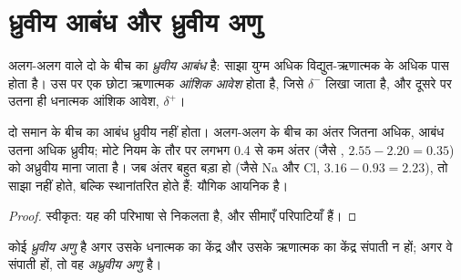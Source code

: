 \section{ध्रुवीय आबंध और ध्रुवीय अणु}

\begin{definition}[ध्रुवीय आबंध, आंशिक आवेश]\label{def:g11:polarity-and-cohesion:polar-bond}
अलग-अलग  वाले दो  के बीच का 
\emph{ध्रुवीय आबंध} है: साझा युग्म अधिक विद्युत-ऋणात्मक
 के अधिक पास होता है। उस  पर एक छोटा ऋणात्मक
\emph{आंशिक आवेश} होता है, जिसे $\delta^-$ लिखा जाता है, और
दूसरे  पर उतना ही धनात्मक आंशिक आवेश, $\delta^+$।
\end{definition}

\begin{proposition}[आबंध कब ध्रुवीय होता है?]\label{prop:g11:polarity-and-cohesion:polar-bond}
दो समान  के बीच का आबंध ध्रुवीय नहीं होता। अलग-अलग  के बीच
 का अंतर जितना अधिक, आबंध उतना अधिक ध्रुवीय; मोटे नियम के
तौर पर लगभग 0.4 से कम अंतर (जैसे
, $2.55 - 2.20 = 0.35$) को अध्रुवीय माना जाता है। जब अंतर बहुत
बड़ा हो (जैसे Na और Cl, $3.16 - 0.93 = 2.23$), तो  साझा नहीं होते,
बल्कि स्थानांतरित होते हैं: यौगिक आयनिक है।
\end{proposition}

\begin{proof}
स्वीकृत: यह  की परिभाषा से निकलता है, और सीमाएँ
परिपाटियाँ हैं।
\end{proof}

\begin{definition}[ध्रुवीय और अध्रुवीय अणु]\label{def:g11:polarity-and-cohesion:polar-molecule}
कोई  \emph{ध्रुवीय अणु} है अगर उसके धनात्मक  का केंद्र और उसके ऋणात्मक  का केंद्र संपाती न हों; अगर
वे संपाती हों, तो वह
\emph{अध्रुवीय अणु} है।
\end{definition}

